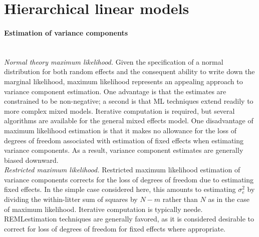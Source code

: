 \section{Hierarchical linear models}


\paragraph{Estimation of variance components} \\
\emph{Normal theory maximum likelihood.} Given the specification of a normal distribution for both random effects and the consequent ability to write down the marginal likelihood, maximum likelihood represents an appealing approach to variance component estimation. One advantage is that the estimates are constrained to be non-negative; a second is that ML techniques extend readily to more complex mixed models. Iterative computation is required, but several algorithms are available for the general mixed effects model. One disadvantage of maximum likelihood estimation is that it makes no allowance for the loss of degrees of freedom associated with estimation of fixed effects when estimating variance components. As a result, variance component estimates are generally biased downward. \\
\emph{Restricted maximum likelihood.} Restricted maximum likelihood estimation of variance components corrects for the loss of degrees of freedom due to estimating fixed effects. In the simple case considered here, this amounts to estimating $\sigma_{e}^{2}$ by dividing the within-litter sum of squares by $N-m$ rather than $N$ as in the case of maximum likelihood. Iterative computation is typically neede. \\
REMLestimation techniques are generally favored, as it is considered desirable to correct for loss of degrees of freedom for fixed effects where appropriate.